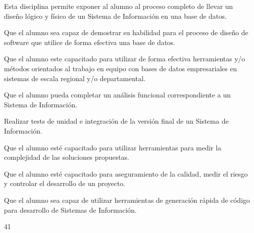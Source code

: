\begin{syllabus}


\begin{justification}
Esta disciplina permite exponer al alumno al proceso completo de llevar un diseño lógico y físico de un Sistema de Información en una base de datos.
\end{justification}

\begin{goals}
\item Que el alumno sea capaz de demostrar su habilidad para el proceso de diseño de software que utilice de forma efectiva una base de datos.
\item Que el alumno este capacitado para utilizar de forma efectiva herramientas y/o métodos orientados al trabajo en equipo con bases de datos empresariales en sistemas de escala regional y/o departamental.
\item Que el alumno pueda completar un análisis funcional correspondiente a un Sistema de Información.
\item Realizar tests de unidad e integración de la versión final de un Sistema de Información.
\item Que el alumno esté capacitado para utilizar herramientas  para medir la complejidad de las soluciones propuestas.
\item Que el alumno esté capacitado para aseguramiento de la calidad, medir el riesgo y controlar el desarrollo de un proyecto.
\item Que el alumno sea capaz de utilizar herramientas de generación rápida de código para desarrollo de Sistemas de Información.
\end{goals}

\begin{outcomes}
\end{outcomes}

\begin{unit}{\LUEIGHTSIXDef}{\LUEIGHTSIXBib}{4}{1}
   \begin{topics}
	\item \OMCONEOHTopicTWOxONEOHxONE
	\item \OMCONEOHTopicTWOxONEOHxONEOH
	\item \OMCONEOHTopicTWOxONEOHxSIX
	\item \OMCONEOHTopicTWOxONEOHxNINE
	\item \OMCTHREETopicTWOxTHREExFIVE
	\item \OMCFOURTopicTWOxFOURxTHREE
	\item \OMCFOURTopicTWOxFOURxFOUR
	\item \OMCFOURTopicTWOxFOURxFIVE
	\item \OMCFOURTopicTWOxFOURxSIX
	\item \OMCFOURTopicTWOxFOURxSEVEN
	\item \OMCFOURTopicTWOxFOURxEIGHT
   \end{topics}
	\LUEIGHTSIXGoal
\end{unit}


\end{syllabus}
